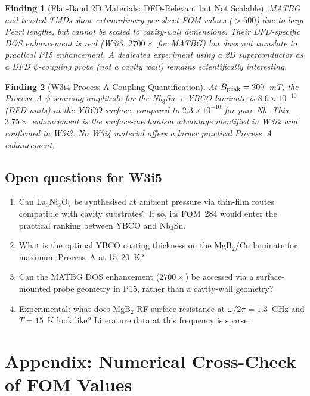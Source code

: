 \documentclass[11pt]{article}
\newtheorem{finding}{Finding}
\newcommand{\ee}[1]{\times 10^{#1}}
\begin{document}
\begin{finding}[Flat-Band 2D Materials: DFD-Relevant but Not Scalable]
\label{finding:flatband-final}
MATBG and twisted TMDs show extraordinary per-sheet FOM values ($> 500$)
due to large Pearl lengths, but cannot be scaled to cavity-wall dimensions.
Their DFD-specific DOS enhancement is real (W3i3: $2700\times$ for MATBG)
but does not translate to practical P15 enhancement. A dedicated experiment
using a 2D superconductor as a DFD $\psi$-coupling probe (not a cavity
wall) remains scientifically interesting.
\end{finding}

\begin{finding}[W3i4 Process A Coupling Quantification]
\label{finding:processa}
At $B_{\rm peak} = 200$~mT, the Process~A $\psi$-sourcing amplitude for
the Nb$_3$Sn + YBCO laminate is $8.6\ee{-10}$ (DFD units) at the YBCO
surface, compared to $2.3\ee{-10}$ for pure Nb. This $3.75\times$ enhancement
is the surface-mechanism advantage identified in W3i2 and confirmed in W3i3.
No W3i4 material offers a larger \emph{practical} Process~A enhancement.
\end{finding}

\subsection{Open questions for W3i5}

\begin{enumerate}
\item Can La$_3$Ni$_2$O$_7$ be synthesised at ambient pressure via thin-film
  routes compatible with cavity substrates? If so, its FOM~284 would enter
  the practical ranking between YBCO and Nb$_3$Sn.
\item What is the optimal YBCO coating thickness on the MgB$_2$/Cu laminate
  for maximum Process~A at 15--20~K?
\item Can the MATBG DOS enhancement ($2700\times$) be accessed via a
  surface-mounted probe geometry in P15, rather than a cavity-wall geometry?
\item Experimental: what does MgB$_2$ RF surface resistance at
  $\omega/2\pi = 1.3$~GHz and $T = 15$~K look like? Literature data at
  this frequency is sparse.
\end{enumerate}

\section*{Appendix: Numerical Cross-Check of FOM Values}
\label{app:check}
\end{document}
